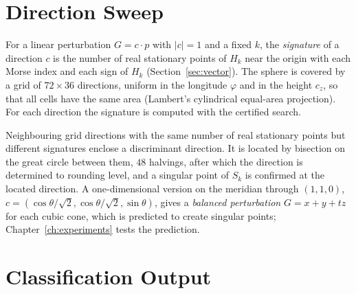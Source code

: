 \section{Direction Sweep}
\label{sec:method-sweep}

For a linear perturbation $G=c\cdot p$ with $|c|=1$ and a fixed $k$, the
\emph{signature} of a direction $c$ is the number of real stationary points of
$H_k$ near the origin with each Morse index and each sign of $H_k$
(Section~\ref{sec:vector}). The sphere is covered by a grid of $72\times36$
directions, uniform in the longitude $\varphi$ and in the height $c_z$, so that
all cells have the same area (Lambert's cylindrical equal-area projection).
For each direction the signature is computed with the certified search.

Neighbouring grid directions with the same number of real stationary points
but different signatures enclose a discriminant direction. It is located by
bisection on the great circle between them, $48$ halvings, after which the
direction is determined to rounding level, and a singular point of $S_k$ is
confirmed at the located direction. A one-dimensional version on the meridian
through $(1,1,0)$, $c=(\cos\theta/\sqrt2,\cos\theta/\sqrt2,\sin\theta)$, gives
a \emph{balanced perturbation} $G=x+y+tz$ for each cubic cone, which is
predicted to create singular points; Chapter~\ref{ch:experiments} tests the
prediction.

\section{Classification Output}
\label{sec:method-output}

